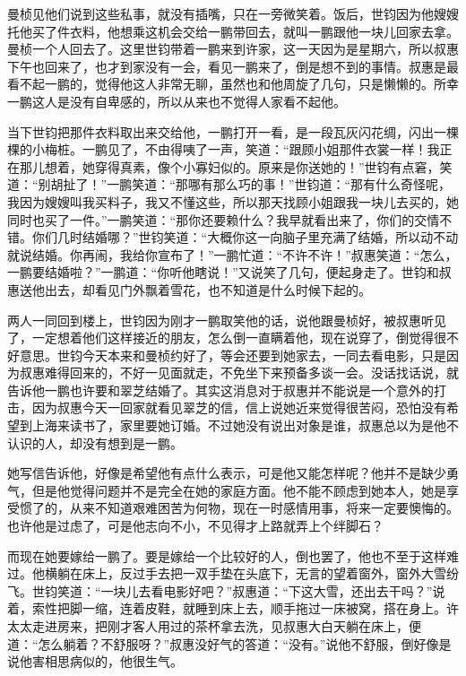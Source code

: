 \par 曼桢见他们说到这些私事，就没有插嘴，只在一旁微笑着。饭后，世钧因为他嫂嫂托他买了件衣料，他想乘这机会交给一鹏带回去，就叫一鹏跟他一块儿回家去拿。曼桢一个人回去了。这里世钧带着一鹏来到许家，这一天因为是星期六，所以叔惠下午也回来了，也才到家没有一会，看见一鹏来了，倒是想不到的事情。叔惠是最看不起一鹏的，觉得他这人非常无聊，虽然也和他周旋了几句，只是懒懒的。所幸一鹏这人是没有自卑感的，所以从来也不觉得人家看不起他。
\par 当下世钧把那件衣料取出来交给他，一鹏打开一看，是一段瓦灰闪花绸，闪出一棵棵的小梅桩。一鹏见了，不由得咦了一声，笑道：“跟顾小姐那件衣裳一样！我正在那儿想着，她穿得真素，像个小寡妇似的。原来是你送她的！”世钧有点窘，笑道：“别胡扯了！”一鹏笑道：“那哪有那么巧的事！”世钧道：“那有什么奇怪呢，我因为嫂嫂叫我买料子，我又不懂这些，所以那天找顾小姐跟我一块儿去买的，她同时也买了一件。”一鹏笑道：“那你还要赖什么？我早就看出来了，你们的交情不错。你们几时结婚哪？”世钧笑道：“大概你这一向脑子里充满了结婚，所以动不动就说结婚。你再闹，我给你宣布了！”一鹏忙道：“不许不许！”叔惠笑道：“怎么，一鹏要结婚啦？”一鹏道：“你听他瞎说！”又说笑了几句，便起身走了。世钧和叔惠送他出去，却看见门外飘着雪花，也不知道是什么时候下起的。
\par 两人一同回到楼上，世钧因为刚才一鹏取笑他的话，说他跟曼桢好，被叔惠听见了，一定想着他们这样接近的朋友，怎么倒一直瞒着他，现在说穿了，倒觉得很不好意思。世钧今天本来和曼桢约好了，等会还要到她家去，一同去看电影，只是因为叔惠难得回来的，不好一见面就走，不免坐下来预备多谈一会。没话找话说，就告诉他一鹏也许要和翠芝结婚了。其实这消息对于叔惠并不能说是一个意外的打击，因为叔惠今天一回家就看见翠芝的信，信上说她近来觉得很苦闷，恐怕没有希望到上海来读书了，家里要她订婚。不过她没有说出对象是谁，叔惠总以为是他不认识的人，却没有想到是一鹏。
\par 她写信告诉他，好像是希望他有点什么表示，可是他又能怎样呢？他并不是缺少勇气，但是他觉得问题并不是完全在她的家庭方面。他不能不顾虑到她本人，她是享受惯了的，从来不知道艰难困苦为何物，现在一时感情用事，将来一定要懊悔的。也许他是过虑了，可是他志向不小，不见得才上路就弄上个绊脚石？
\par 而现在她要嫁给一鹏了。要是嫁给一个比较好的人，倒也罢了，他也不至于这样难过。他横躺在床上，反过手去把一双手垫在头底下，无言的望着窗外，窗外大雪纷飞。世钧笑道：“一块儿去看电影好吧？”叔惠道：“下这大雪，还出去干吗？”说着，索性把脚一缩，连着皮鞋，就睡到床上去，顺手拖过一床被窝，搭在身上。许太太走进房来，把刚才客人用过的茶杯拿去洗，见叔惠大白天躺在床上，便道：“怎么躺着？不舒服呀？”叔惠没好气的答道：“没有。”说他不舒服，倒好像是说他害相思病似的，他很生气。
